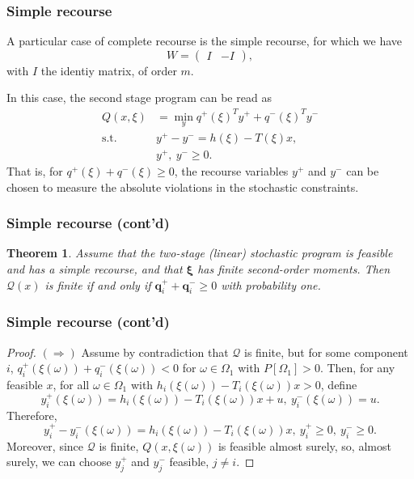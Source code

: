 \documentclass{beamer}
\newtheorem{theo}{Theorem}
\def\bxi{\boldsymbol\xi}
\def\bxi{\boldsymbol\xi}
\begin{document}
\begin{frame}
\frametitle{Simple recourse}

A particular case of complete recourse is the {\red simple recourse}, for which we have
\[
W = \begin{pmatrix} I & -I \end{pmatrix},
\]
with $I$ the identiy matrix, of order $m$.

\mbox{}

In this case, the second stage program can be read as
\begin{align*}
Q(x,\xi) & = \min_y q^+(\xi)^Ty^+ + q^-(\xi)^Ty^- \\
\mbox{s.t. } & y^+ - y^- = h(\xi)-T(\xi)x,\\
& y^+,\ y^- \geq 0.
\end{align*}
That is, for $q^+(\xi) + q^-(\xi) \geq 0$, the recourse variables $y^+$ and $y^-$ can be chosen to %
measure the absolute violations in the stochastic constraints.

\end{frame}

\begin{frame}
\frametitle{Simple recourse (cont'd)}

\begin{theo}
Assume that the two-stage (linear) stochastic program is feasible and has a simple recourse, and that $\bxi$ has finite second-order moments.
Then $\mathcal{Q}(x)$ is finite if and only if $\boldsymbol{q}_i^+ + \boldsymbol{q}_i^- \geq 0$ with probability one.
\end{theo}

\end{frame}

\begin{frame}
\frametitle{Simple recourse (cont'd)}

\begin{proof}
{\bf $(\Rightarrow)$} 
Assume by contradiction that $\mathcal{Q}$ is finite, but for some component $i$, $q_i^+(\xi(\omega)) + q_i^-(\xi(\omega)) < 0$ for $\omega \in \Omega_1$ with $P[\Omega_1] > 0$.
Then, for any feasible $x$, for all $\omega \in \Omega_1$ with $h_i(\xi(\omega))-T_i(\xi(\omega))x > 0$, define
$$
y_i^+(\xi(\omega)) = h_i(\xi(\omega)) - T_i(\xi(\omega))x + u,\  y_i^-(\xi(\omega)) = u.
$$
Therefore, 
$$
y_i^+ - y_i^-(\xi(\omega)) = h_i(\xi(\omega)) - T_i(\xi(\omega))x,\ y_i^+ \geq 0,\ y_i^- \geq 0.
$$
Moreover, since $\mathcal{Q}$ is finite, $Q(x, \xi(\omega))$ is feasible almost surely,
so, almost surely, we can choose $y_j^+$ and $y_j^-$ feasible, $j \ne i$.

\end{proof}

\end{frame}
\end{document}

